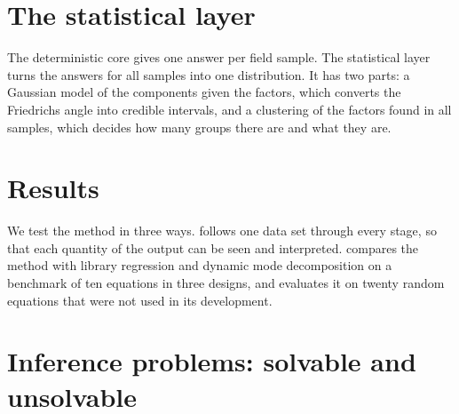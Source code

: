 \section{The statistical layer}\label{sec:bayesian}
The deterministic core gives one answer per field sample. The statistical layer turns the answers for all samples
into one distribution. It has two parts: a Gaussian model of the components given the factors, which converts the
Friedrichs angle into credible intervals, and a clustering of the factors found in all samples, which decides how
many groups there are and what they are.


\section{Results}\label{sec:results}
We test the method in three ways.  follows one data set through every stage, so that each quantity of
the output can be seen and interpreted.  compares the method with library regression and dynamic mode
decomposition on a benchmark of ten equations in three designs, and evaluates it on twenty random equations that were
not used in its development.



\section{Inference problems: solvable and unsolvable}\label{sec:limits}




\appendix






